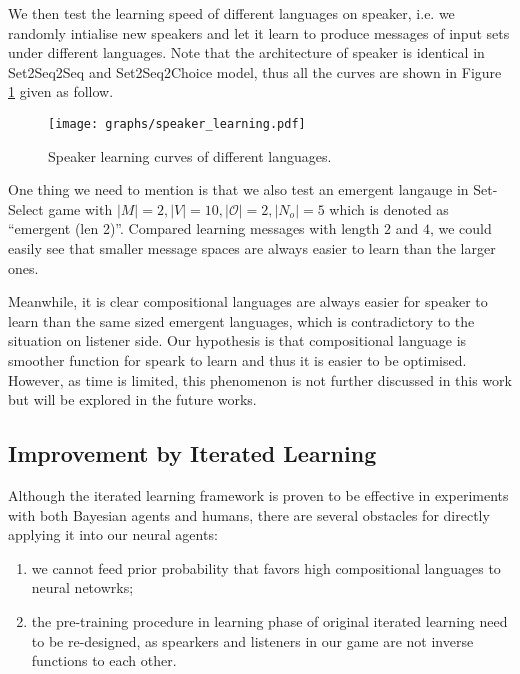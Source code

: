 We then test the learning speed of different languages on speaker, i.e. we randomly intialise new speakers and let it learn to produce messages of input sets under different languages. Note that the architecture of speaker is identical in Set2Seq2Seq and Set2Seq2Choice model, thus all the curves are shown in Figure \ref{fig4.3:speaker_learning} given as follow.

\begin{figure}[!h]
    \centering
    \texttt{[image: graphs/speaker\_learning.pdf]}
    \caption{Speaker learning curves of different languages.}
    \label{fig4.3:speaker_learning}
\end{figure}

One thing we need to mention is that we also test an emergent langauge in Set-Select game with $|M|=2, |V|=10, |\mathcal{O}|=2, |N_o|=5$ which is denoted as ``emergent (len 2)''. Compared learning messages with length $2$ and $4$, we could easily see that smaller message spaces are always easier to learn than the larger ones.

Meanwhile, it is clear compositional languages are always easier for speaker to learn than the same sized emergent languages, which is contradictory to the situation on listener side. Our hypothesis is that compositional language is smoother function for speark to learn and thus it is easier to be optimised. However, as time is limited, this phenomenon is not further discussed in this work but will be explored in the future works.

\subsection{Improvement by Iterated Learning}
\label{ssec4.3.:iterated_learning_improve}

Although the iterated learning framework \cite{kirby2002emergence} is proven to be effective in experiments with both Bayesian agents and humans, there are several obstacles for directly applying it into our neural agents:

\begin{enumerate}
    \item we cannot feed prior probability that favors high compositional languages to neural netowrks;
    \item the pre-training procedure in learning phase of original iterated learning need to be re-designed, as spearkers and listeners in our game are not inverse functions to each other.
\end{enumerate}

